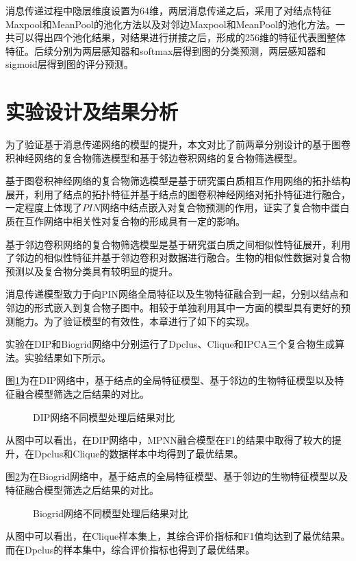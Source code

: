 消息传递过程中隐层维度设置为64维，两层消息传递之后，采用了对结点特征Maxpool和MeanPool的池化方法以及对邻边Maxpool和MeanPool的池化方法。一共可以得出四个池化结果，对结果进行拼接之后，形成的256维的特征代表图整体特征。后续分别为两层感知器和softmax层得到图的分类预测，两层感知器和sigmoid层得到图的评分预测。

\section{实验设计及结果分析}
\label{section:MPNN:experience}
为了验证基于消息传递网络的模型的提升，本文对比了前两章分别设计的基于图卷积神经网络的复合物筛选模型和基于邻边卷积网络的复合物筛选模型。

基于图卷积神经网络的复合物筛选模型是基于研究蛋白质相互作用网络的拓扑结构展开，利用了结点的拓扑特征并基于结点的图卷积神经网络对拓扑特征进行融合，一定程度上体现了$PIN$网络中结点嵌入对复合物预测的作用，证实了复合物中蛋白质在互作网络中相关性对复合物的形成具有一定的影响。

基于邻边卷积网络的复合物筛选模型是基于研究蛋白质之间相似性特征展开，利用了邻边的相似性特征并基于邻边卷积对数据进行融合。生物的相似性数据对复合物预测以及复合物分类具有较明显的提升。

消息传递模型致力于向PIN网络全局特征以及生物特征融合到一起，分别以结点和邻边的形式嵌入到复合物子图中。相较于单独利用其中一方面的模型具有更好的预测能力。为了验证模型的有效性，本章进行了如下的实现。

实验在DIP和Biogrid网络中分别运行了Dpclus、Clique和IPCA三个复合物生成算法。实验结果如下所示。

图\ref{fig:result/DIP/fusion}为在DIP网络中，基于结点的全局特征模型、基于邻边的生物特征模型以及特征融合模型筛选之后结果的对比。
\begin{figure}[htbp]
    \centering
    \vskip0.2cm
    \caption{DIP网络不同模型处理后结果对比}
    \label{fig:result/DIP/fusion}
\end{figure}

从图中可以看出，在DIP网络中，MPNN融合模型在F1的结果中取得了较大的提升，在Dpclus和Clique的数据样本中均得到了最优结果。

图\ref{fig:result/Biogrid/fusion}为在Biogrid网络中，基于结点的全局特征模型、基于邻边的生物特征模型以及特征融合模型筛选之后结果的对比。
\begin{figure}[htbp]
    \centering
    \vskip0.2cm
    \caption{Biogrid网络不同模型处理后结果对比}
    \label{fig:result/Biogrid/fusion}
\end{figure}
从图中可以看出，在Clique样本集上，其综合评价指标和F1值均达到了最优结果。而在Dpclus的样本集中，综合评价指标也得到了最优结果。


